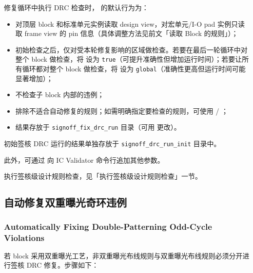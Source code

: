 修复循环中执行 DRC 检查时， 的默认行为为：
\begin{itemize}
  \item 对顶层 block 和标准单元实例读取 design view，对宏单元/I-O pad 实例只读取 frame view 的 pin 信息（具体调整方法见前文「读取 Block 的规则」）；
  \item 初始检查之后，仅对受本轮修复影响的区域做检查。若要在最后一轮循环中对整个 block 做检查，将  设为 \texttt{true}（可提升准确性但增加运行时间）；若要让所有循环都对整个 block 做检查，将  设为 \texttt{global}（准确性更高但运行时间可能显著增加）；
  \item 不检查子 block 内部的违例；
  \item 排除不适合自动修复的规则；如需明确指定要检查的规则，可使用  / ；
  \item 结果存放于 \texttt{signoff\_fix\_drc\_run} 目录（可用  更改）。
\end{itemize}

\begin{noteBox}
初始签核 DRC 运行的结果单独存放于 \texttt{signoff\_drc\_run\_init} 目录中。
\end{noteBox}

此外，可通过  向 IC Validator 命令行追加其他参数。

\begin{seeAlsoBox}
执行签核级设计规则检查，见「执行签核级设计规则检查」一节。
\end{seeAlsoBox}

\subsection{自动修复双重曝光奇环违例}
\subsubsection*{Automatically Fixing Double-Patterning Odd-Cycle Violations}

若 block 采用双重曝光工艺，非双重曝光布线规则与双重曝光布线规则必须分开进行签核 DRC 修复。步骤如下：

